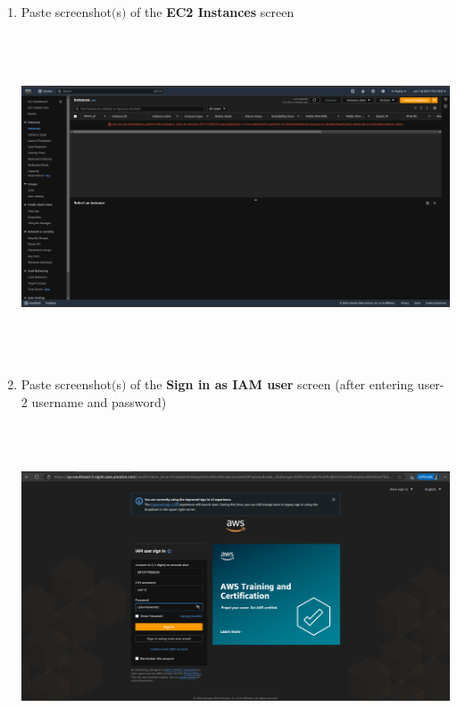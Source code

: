 \documentclass[11pt]{article}
\begin{document}
\begin{enumerate}[resume]
    \vspace{75mm}


    \item Paste screenshot$($s$)$ of the \textbf{EC2 Instances} screen\\
    \vspace{5mm}

    {\centering
    \includegraphics[width=6.1in, height=3.8in]{pics/9.png}
    }



    \item Paste screenshot$($s$)$ of the \textbf{Sign in as IAM user} screen (after entering user-2 username and password) \\
    \vspace{5mm}

    {\centering
    \includegraphics[width=6.1in, height=3.8in]{pics/10.png}
    }


\end{enumerate}
\end{document}
